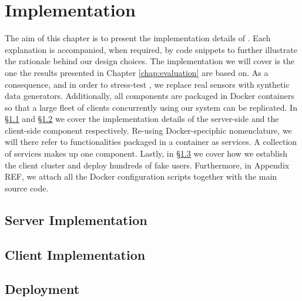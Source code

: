 \chapter{Implementation} \label{chap:implementation}

The aim of this chapter is to present the implementation details of \projName.
Each explanation is accompanied, when required, by code snippets to further illustrate the rationale behind our design choices.
The implementation we will cover is the one the results presented in Chapter \ref{chap:evaluation} are based on.
As a consequence, and in order to stress-test \projName, we replace real sensors with synthetic data generators.
Additionally, all components are packaged in Docker containers so that a large fleet of clients concurrently using our system can be replicated.
In \S\ref{sec:server-implementation} and \S\ref{sec:client-implementation} we cover the implementation details of the server-side and the client-side component respectively.
Re-using Docker-speciphic nomenclature, we will there refer to functionalities packaged in a container as services.
A collection of services makes up one component.
Lastly, in \S\ref{sec:deployment} we cover how we establish the client cluster and deploy hundreds of fake users.
Furthermore, in Appendix REF, we attach all the Docker configuration scripts together with the main source code. %

\section{Server Implementation} \label{sec:server-implementation}

\section{Client Implementation} \label{sec:client-implementation}

\section{Deployment} \label{sec:deployment}
